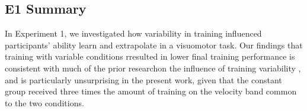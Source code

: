 \documentclass[
  12pt,
  letterpaper,
]{article}
\begin{document}
\begin{table}

\caption{\label{tbl-e1-bmm-vx}}


\end{table}%

\subsection{E1 Summary}\label{e1-summary}

In Experiment 1, we investigated how variability in training influenced
participants' ability learn and extrapolate in a visuomotor task. Our
findings that training with variable conditions rresulted in lower final
training performance is consistent with much of the prior researchon the
influence of training variability
\autocite{ravivHowVariabilityShapes2022,soderstromLearningPerformanceIntegrative2015},
and is particularly unsurprising in the present work, given that the
constant group received three times the amount of training on the
velocity band common to the two conditions.
\end{document}
